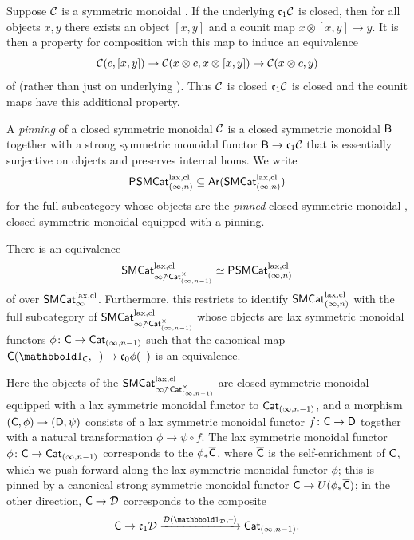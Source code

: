 \documentclass[a4paper,11pt]{article}
\begin{document}
\begin{observation}
  Suppose $\mathcal{C}$ is a symmetric monoidal \incat{}. If the underlying
  \icat{} $\mathfrak{c}_{1} \mathcal{C}$ is closed, then for all objects $x,y$ there
  exists an object $[x,y]$ and a counit map $x \otimes [x,y] \to
  y$. It is then a property for composition with this map to induce an
  equivalence
  \[ \nC(c, [x,y]) \to \nC(x \otimes c,x \otimes [x,y]) \to \nC(x
    \otimes c, y)\] of \inmcats{} (rather than just on
  underlying \igpds{}). Thus $\mathcal{C}$ is closed \IFF{} $\mathfrak{c}_{1} \mathcal{C}$ is closed
  and the counit maps have this additional property.
\end{observation}

\begin{defn}
  A \emph{pinning} of a
  closed symmetric monoidal \incat{} $\mathcal{C}$ is a closed symmetric
  monoidal \icat{} $\textup{\textsf{B}}$ together with a strong symmetric
  monoidal functor $\oB \to \core \nC$ that is essentially surjective
  on objects and
  preserves internal homs. We write
  \[ \textup{\textsf{P}}^{}\textup{\textsf{SMCat}}_{(\infty,n)}^{\text{\textup{lax}},\text{\textup{cl}}} \subseteq \textup{\textsf{Ar}}(\textup{\textsf{SMCat}}_{(\infty,n)}^{\text{\textup{lax}},\text{\textup{cl}}}) \] for the full
  subcategory whose objects are the \emph{pinned} closed symmetric
  monoidal \incats{}, \ie{} closed symmetric monoidal \incats{}
  equipped with a pinning.
\end{defn}

\begin{thm}\label{thm:closedsmenr}
  There is an
  equivalence 
  \[ \SMCatIlcllsl{\CatInm^{\times}} \simeq \PSMCatInlcl \] of
  \icats{} over
  $\textup{\textsf{SMCat}}_{\infty}^{\text{\textup{lax}},\text{\textup{cl}}}$. Furthermore, this restricts to identify $\textup{\textsf{SMCat}}_{(\infty,n)}^{\text{\textup{lax}},\text{\textup{cl}}}$ 
  with the full subcategory of $\SMCatIlcllsl{\CatInm^{\times}}$ whose
  objects are lax symmetric monoidal functors
  $\phi \colon \oC \to \CatInm$ such that the canonical map
  $\oC(\bbone_{\oC}, \blank) \to \core[0] \phi(\blank)$ is
  an equivalence.
\end{thm}

\begin{remark}
  Here the objects of the \icat{} $\SMCatIlcllsl{\CatInm^{\times}}$ are closed
  symmetric monoidal \icats{} equipped with a lax symmetric monoidal
  functor to $\textup{\textsf{Cat}}_{(\infty,n-1)}$, and a morphism $(\oC, \phi) \to (\oD, \psi)$
  consists of a lax symmetric monoidal functor $f \colon \oC \to \oD$
  together with a natural transformation $\phi \to \psi \circ f$. The
  lax symmetric monoidal functor $\phi \colon \oC \to \CatInm$
  corresponds to the \incat{} $\phi_{*}\overline{\textup{\textsf{C}}}$, where
  $\overline{\textup{\textsf{C}}}$ is the self-enrichment of $\textup{\textsf{C}}$, which we push
  forward along the lax symmetric monoidal functor $\phi$; this is
  pinned by a canonical strong symmetric monoidal functor
  $\oC \to U(\phi_{*}\overline{\oC})$; in the other direction,
  $\oC \to \nD$ corresponds to the composite
  \[\oC \to \core \nD \xto{\nD(\bbone_{\nD}, \blank)} \CatInm.\]
\end{remark}
\end{document}
